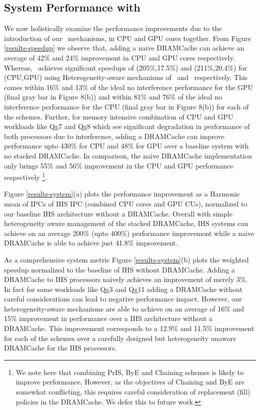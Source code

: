 \subsection{System Performance with \cachename}
We now holistically examine the performance improvements due to the introduction of our \cachename\ mechanisms, in  CPU and GPU cores together. From Figure \ref{results-speedup} we observe that, adding a naive DRAMCache can achieve an average of 42\% and 24\% improvement in CPU and GPU cores respectively. Whereas, \cachename\ achieves significant speedups of (205\%,17.5\%) and (211\%,20.4\%) for (CPU,GPU) using Heterogeneity-aware mechanisms of \bypassname\ and \chaining\ respectively. This comes within 16\% and 13\% of the ideal no interference performance for the GPU (final gray bar in Figure 8(b)) and within 81\% and 76\% of the ideal no interference performance for the CPU (final gray bar in Figure 8(b)) for each of the schemes. Further, for memory intensive combination of CPU and GPU workloads like Qg7 and Qg8 which see significant degradation in performance of both processors due to interference, adding a DRAMCache can improve performance upto 430\% for CPU and 48\% for GPU over a baseline system with no stacked DRAMCache. In comparison, the naive DRAMCache implementation only brings 55\% and 56\% improvement in the CPU and GPU performance respectively
\footnote{We note here that combining PrIS, ByE and Chaining schemes is likely to improve performance. However, as the objectives of Chaining and ByE are somewhat conflicting, this requires careful consideration of replacement (fill) policies in the DRAMCache. We defer this to future work.}.
\par Figure \ref{results-system}(a) plots the performance improvement as a Harmonic mean of IPCs of IHS IPC (combined CPU cores and GPU CUs), normalized to our baseline IHS architecture without a DRAMCache. Overall with simple heterogeneity aware management of the stacked DRAMCache, IHS systems can achieve on an average 200\% (upto 400\%) performance improvement while a naive DRAMCache is able to achieve just 41.8\% improvement.
\par As a comprehensive system metric Figure \ref{results-system}(b) plots the weighted speedup normalized to the baseline of IHS without DRAMCache. Adding a DRAMCache to IHS processors naively achieves an improvement of merely 3\%. In fact for some workloads like Qg3 and Qg11 adding a DRAMCache without careful considerations can lead to negative performance impact. However, our heterogeneity-aware mechanisms are able to achieve on an average of 16\% and 15\%  improvement in performance over a IHS architecture without a DRAMCache. This improvement corresponds to a 12.9\% and 11.5\% improvement for each of the schemes over a carefully designed but heterogeneity unaware DRAMCache for the IHS processors.
